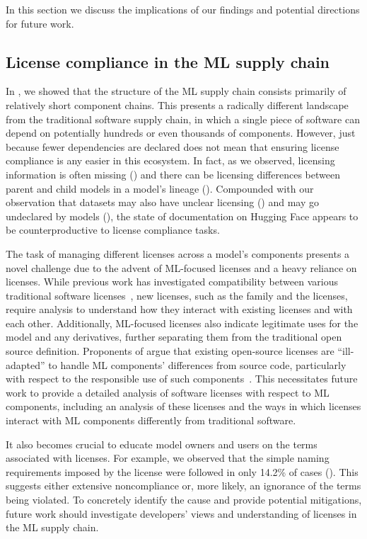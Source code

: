 In this section we discuss the implications of our findings and potential directions for future work. %

\subsection{License compliance in the ML supply chain}
In , we showed that the structure of the ML supply chain consists primarily of relatively short component chains. %
This presents a radically different landscape from the traditional software supply chain, in which a single piece of software can depend on potentially hundreds or even thousands of components. However, just because fewer dependencies are declared does not mean that ensuring license compliance is any easier in this ecosystem. In fact, as we observed, licensing information is often missing () and there can be licensing differences between parent and child models in a model's lineage (). Compounded with our observation that datasets may also have unclear licensing () and may go undeclared by models (), the state of documentation on Hugging Face appears to be counterproductive to license compliance tasks. 

The task of managing different licenses across a model's components presents a novel challenge due to the advent of ML-focused licenses and a heavy reliance on  licenses. 
While previous work has investigated compatibility between various traditional software licenses~\cite{kapitsaki2022towards,liu2024catch}, new licenses, such as the  family and the  licenses, require %
analysis to understand how they interact with existing licenses and with each other. Additionally, ML-focused licenses also indicate legitimate uses for the model and any derivatives, further separating them from the traditional open source definition. %
Proponents of  argue that existing open-source licenses are ``ill-adapted'' to handle ML components' differences from source code, particularly with respect to the responsible use of such components~\cite{openrailTowards}. %
This necessitates future work to provide a detailed analysis of software licenses with respect to ML components, including an analysis of these licenses and the ways in which licenses interact with ML components differently from traditional software.

It also becomes crucial to educate %
model owners and users on the terms associated with licenses.  For example, we observed that the simple naming requirements imposed by the  license were followed in only 14.2\% of cases ().  This suggests either extensive noncompliance or, more likely, an ignorance of the terms being violated. To concretely identify the cause and provide potential mitigations, future work should investigate developers' views and understanding of licenses in the ML supply chain.

